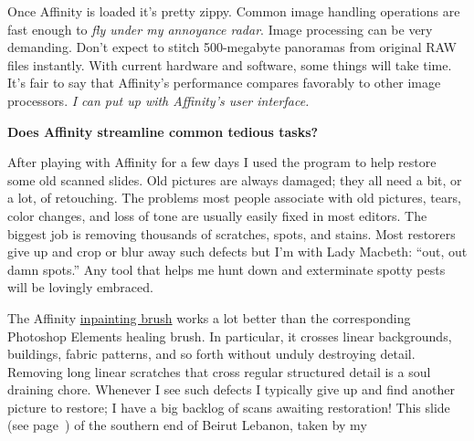 Once Affinity is loaded it's pretty zippy. Common image handling
operations are fast enough to \emph{fly under my annoyance radar}. Image
processing can be very demanding. Don't expect to stitch 500-megabyte
panoramas from original RAW files instantly. With current hardware and
software, some things will take time. It's fair to say that Affinity's
performance compares favorably to other image processors. \emph{I can
put up with Affinity's user interface.}


\medskip
\noindent\textbf{Does Affinity streamline common tedious tasks?}
\medskip


After playing with Affinity for a few days I used the program to help
restore some old scanned slides. Old pictures are always damaged; they
all need a bit, or a lot, of retouching. The problems most people
associate with old pictures, tears, color changes, and loss of tone are
usually easily fixed in most editors. The biggest job is removing
thousands of scratches, spots, and stains. Most restorers give up and
crop or blur away such defects but I'm with Lady Macbeth: ``out, out
damn spots.'' Any tool that helps me hunt down and exterminate spotty
pests will be lovingly embraced.

The Affinity \href{https://vimeo.com/130966523}{inpainting brush} works
a lot better than the corresponding Photoshop Elements healing brush. In
particular, it crosses linear backgrounds, buildings, fabric patterns,
and so forth without unduly destroying detail. Removing long linear
scratches that cross regular structured detail is a soul draining chore.
Whenever I see such defects I typically give up and find another picture
to restore; I have a big backlog of scans awaiting restoration! This
slide (see page~\pageref{fig:5317X0}) of the southern end of Beirut Lebanon, taken by my


